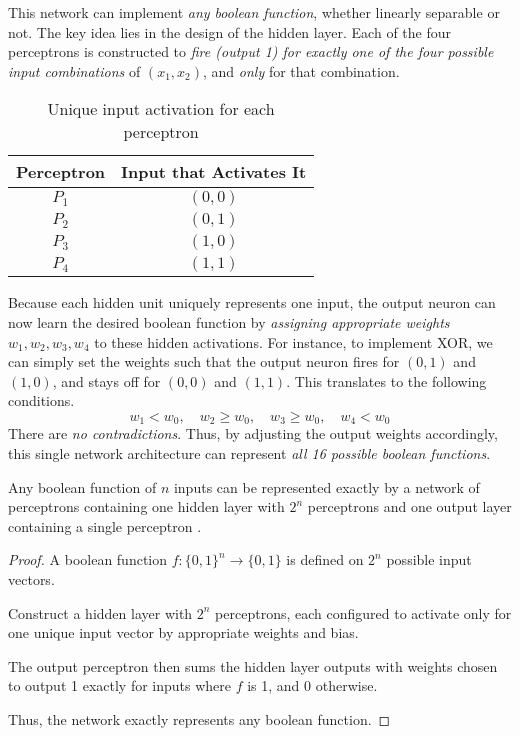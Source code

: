 This network can implement \textit{any boolean function}, whether linearly separable or not. The key idea lies in the design of the hidden layer. Each of the four perceptrons is constructed to \textit{fire (output 1) for exactly one of the four possible input combinations} of $(x_1, x_2)$, and \textit{only} for that combination.

\begin{table}[h]
\centering
\begin{tabular}{cc}
\textbf{Perceptron} & \textbf{Input that Activates It} \\
\hline
$P_1$ & $(0, 0)$ \\
$P_2$ & $(0, 1)$ \\
$P_3$ & $(1, 0)$ \\
$P_4$ & $(1, 1)$ \\
\end{tabular}
\caption{Unique input activation for each perceptron}
\end{table}

Because each hidden unit uniquely represents one input, the output neuron can now learn the desired boolean function by \textit{assigning appropriate weights} $w_1, w_2, w_3, w_4$ to these hidden activations. For instance, to implement XOR, we can simply set the weights such that the output neuron fires for $(0,1)$ and $(1,0)$, and stays off for $(0,0)$ and $(1,1)$. This translates to the following conditions.
\[
w_1 < w_0,\quad w_2 \geq w_0,\quad w_3 \geq w_0,\quad w_4 < w_0
\]
There are \textit{no contradictions}. Thus, by adjusting the output weights accordingly, this single network architecture can represent \textit{all 16 possible boolean functions}.

\begin{theorem}
    Any boolean function of \( n \) inputs can be represented exactly by a network of perceptrons containing one hidden layer with \( 2^n \) perceptrons and one output layer containing a single perceptron \cite{khapra2018deeplearning}.
\end{theorem}

\begin{proof}
A boolean function \( f: \{0,1\}^n \to \{0,1\} \) is defined on \( 2^n \) possible input vectors.

Construct a hidden layer with \( 2^n \) perceptrons, each configured to activate only for one unique input vector by appropriate weights and bias.

The output perceptron then sums the hidden layer outputs with weights chosen to output 1 exactly for inputs where \( f \) is 1, and 0 otherwise.

Thus, the network exactly represents any boolean function.
\end{proof}

